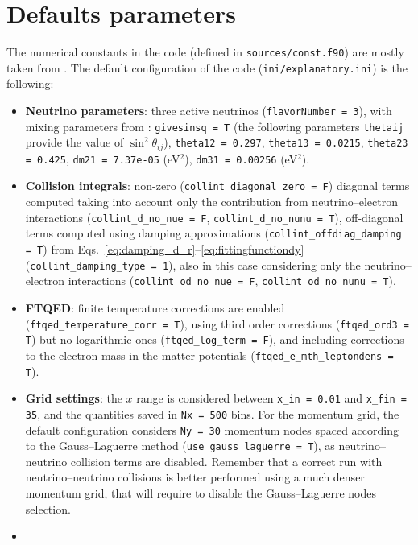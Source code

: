 \documentclass[notitlepage,showpacs,preprintnumbers,amsmath,amssymb,superscriptaddress,prd,onecolumn]{revtex4-1}
\begin{document}
\section{Defaults parameters}
\label{ssec:default}
The numerical constants in the code (defined in \texttt{sources/const.f90})
are mostly taken from \cite{Tanabashi:2018oca}.
The default configuration of the code (\texttt{ini/explanatory.ini}) is the following:
%
\begin{itemize}
%
\item
\textbf{Neutrino parameters}: three active neutrinos (\texttt{flavorNumber = 3}), with mixing parameters from \cite{Tanabashi:2018oca}:
\texttt{givesinsq = T} (the following parameters \texttt{thetaij} provide the value of $\sin^2\theta_{ij}$),
\texttt{theta12 = 0.297},
\texttt{theta13 = 0.0215},
\texttt{theta23 = 0.425},
\texttt{dm21 = 7.37e-05} (eV$^2$),
\texttt{dm31 = 0.00256} (eV$^2$).
%
\item
\textbf{Collision integrals}: non-zero (\texttt{collint\_diagonal\_zero = F}) diagonal terms
computed taking into account only the contribution from neutrino--electron interactions
(\texttt{collint\_d\_no\_nue = F}, \texttt{collint\_d\_no\_nunu = T}),
off-diagonal terms computed using damping approximations
(\texttt{collint\_offdiag\_damping = T})
from Eqs.~\eqref{eq:damping_d_r}--\eqref{eq:fittingfunctiondy} (\texttt{collint\_damping\_type = 1}),
also in this case considering only the neutrino--electron interactions
(\texttt{collint\_od\_no\_nue = F}, \texttt{collint\_od\_no\_nunu = T}).
%
\item
\textbf{FTQED}:
finite temperature corrections are enabled
(\texttt{ftqed\_temperature\_corr = T}),
using third order corrections (\texttt{ftqed\_ord3 = T})
but no logarithmic ones (\texttt{ftqed\_log\_term = F}),
and including corrections to the electron mass in the matter potentials
(\texttt{ftqed\_e\_mth\_leptondens = T}).
%
\item
\textbf{Grid settings}:
the $x$ range is considered between
\texttt{x\_in = 0.01} and
\texttt{x\_fin = 35},
and the quantities saved in \texttt{Nx = 500} bins.
For the momentum grid, the default configuration considers \texttt{Ny = 30} momentum nodes
spaced according to the Gauss--Laguerre method (\texttt{use\_gauss\_laguerre = T}),
as neutrino--neutrino collision terms are disabled.
Remember that a correct run with neutrino--neutrino collisions is better performed
using a much denser momentum grid, that will require to disable the Gauss--Laguerre nodes selection.
%
\item

\end{itemize}
\end{document}
